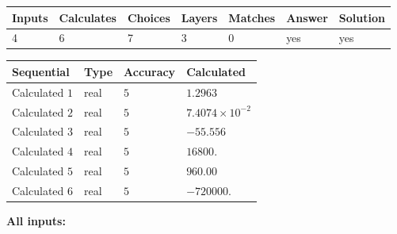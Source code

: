 \documentclass[12pt]{article}
\begin{document}
 

 
\vspace{0.3in}
   
   
   
   
\noindent\begin{tabular}{|l|l|l|l|l|l|l|}
 \hline
Inputs & Calculates & Choices & Layers & Matches & Answer & Solution \\ \hline
           4  & 
           6  & 
           7
  & 
           3  & 
           0  & 
  yes & 
  yes 
  \\ \hline
 \end{tabular}
   
   
   
   
\noindent{}
   
   
  
  
\noindent\begin{tabular}{|l|l|l|l|}
\hline
 Sequential & Type & Accuracy & Calculated \\ 
\hline
 
 
  Calculated $            1 $ & real & $            5  $ & 
 $ 1.2963 $ 
 \\  \hline  
 
 
  Calculated $            2 $ & real & $            5  $ & 
 $ 7.4074 \times 10^{-2} $ 
 \\  \hline  
 
 
  Calculated $            3 $ & real & $            5  $ & 
 $ -55.556 $ 
 \\  \hline  
 
 
  Calculated $            4 $ & real & $            5  $ & 
 $ 16800. $ 
 \\  \hline  
 
 
  Calculated $            5 $ & real & $            5  $ & 
 $ 960.00 $ 
 \\  \hline  
 
 
  Calculated $            6 $ & real & $            5  $ & 
 $ -720000. $ 
 \\  \hline  
 \end{tabular}
   
   
   
   
\noindent\vspace{0.1in}\hspace{-0.08in} {\textbf{\Large{All inputs: }}}
   
   
  
\end{document}
